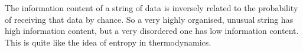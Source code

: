 The information content of a string of data is inversely
related to the probability of receiving that data 
by chance. So a very highly organised, unusual string
has high information content, but a very disordered
one has low information content. This is quite like the
idea of entropy in thermodynamics.